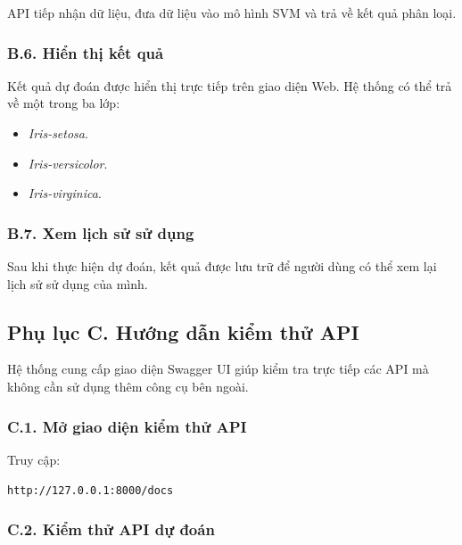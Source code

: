 \documentclass[14pt]{extarticle}
\begin{document}
	\noindent
	API tiếp nhận dữ liệu, đưa dữ liệu vào mô hình SVM và trả về kết quả
	phân loại.
	
	\subsubsection*{B.6. Hiển thị kết quả}
	
	\noindent
	Kết quả dự đoán được hiển thị trực tiếp trên giao diện Web. Hệ thống
	có thể trả về một trong ba lớp:
	
	\begin{itemize}[leftmargin=*]
		\item \textit{Iris-setosa}.
		\item \textit{Iris-versicolor}.
		\item \textit{Iris-virginica}.
	\end{itemize}
	
	
	
	\subsubsection*{B.7. Xem lịch sử sử dụng}
	
	\noindent
	Sau khi thực hiện dự đoán, kết quả được lưu trữ để người dùng có thể
	xem lại lịch sử sử dụng của mình.
	
	
	
	
	
	\subsection*{Phụ lục C. Hướng dẫn kiểm thử API}
	
	\noindent
	Hệ thống cung cấp giao diện Swagger UI giúp kiểm tra trực tiếp các
	API mà không cần sử dụng thêm công cụ bên ngoài.
	
	\subsubsection*{C.1. Mở giao diện kiểm thử API}
	
	\noindent
	Truy cập:
	
	\begin{center}
		\texttt{http://127.0.0.1:8000/docs}
	\end{center}
	
	
	\subsubsection*{C.2. Kiểm thử API dự đoán}
	
\end{document}
